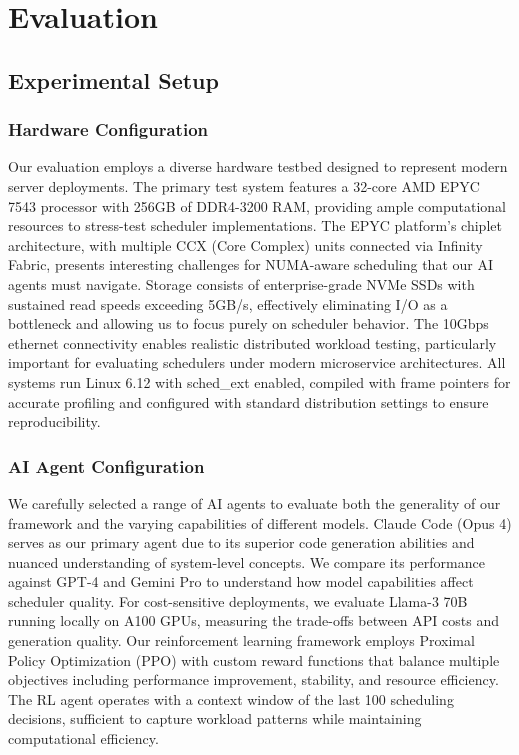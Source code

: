 \section{Evaluation}

\subsection{Experimental Setup}

\subsubsection{Hardware Configuration}
Our evaluation employs a diverse hardware testbed designed to represent modern server deployments. The primary test system features a 32-core AMD EPYC 7543 processor with 256GB of DDR4-3200 RAM, providing ample computational resources to stress-test scheduler implementations. The EPYC platform's chiplet architecture, with multiple CCX (Core Complex) units connected via Infinity Fabric, presents interesting challenges for NUMA-aware scheduling that our AI agents must navigate. Storage consists of enterprise-grade NVMe SSDs with sustained read speeds exceeding 5GB/s, effectively eliminating I/O as a bottleneck and allowing us to focus purely on scheduler behavior. The 10Gbps ethernet connectivity enables realistic distributed workload testing, particularly important for evaluating schedulers under modern microservice architectures. All systems run Linux 6.12 with sched\_ext enabled, compiled with frame pointers for accurate profiling and configured with standard distribution settings to ensure reproducibility.

\subsubsection{AI Agent Configuration}
We carefully selected a range of AI agents to evaluate both the generality of our framework and the varying capabilities of different models. Claude Code (Opus 4) serves as our primary agent due to its superior code generation abilities and nuanced understanding of system-level concepts. We compare its performance against GPT-4 and Gemini Pro to understand how model capabilities affect scheduler quality. For cost-sensitive deployments, we evaluate Llama-3 70B running locally on A100 GPUs, measuring the trade-offs between API costs and generation quality. Our reinforcement learning framework employs Proximal Policy Optimization (PPO) with custom reward functions that balance multiple objectives including performance improvement, stability, and resource efficiency. The RL agent operates with a context window of the last 100 scheduling decisions, sufficient to capture workload patterns while maintaining computational efficiency.

